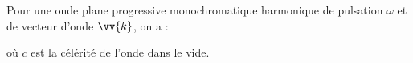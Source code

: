 \documentclass[a4paper]{article}
\begin{document}
\pagestyle{fancy}
\fancyhf{}
\setlength{\headheight}{15pt}

\begin{center}
	\large{}
\end{center}


Pour une onde plane progressive monochromatique harmonique de pulsation \(\omega\) et de vecteur d'onde \(\vv{k}\), on a :
\begin{center}
\end{center}
où \(c\) est la célérité de l'onde dans le vide.
\end{document}
